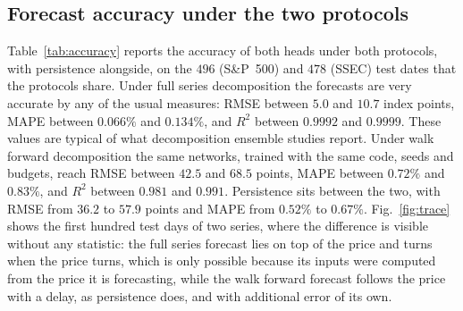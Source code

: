 \documentclass[pdflatex,sn-mathphys-num]{sn-jnl}%
\theoremstyle{thmstyleone}%
\theoremstyle{thmstyletwo}%
\theoremstyle{thmstylethree}%
\begin{document}
\subsection{Forecast accuracy under the two protocols}
Table~\ref{tab:accuracy} reports the accuracy of both heads under both
protocols, with persistence alongside, on the $496$ (S\&P~500) and $478$
(SSEC) test dates that the protocols share. Under full series decomposition
the forecasts are very accurate by any of the usual measures: RMSE between
$5.0$ and $10.7$ index points, MAPE between $0.066\%$ and $0.134\%$, and $R^2$
between $0.9992$ and $0.9999$. These values are typical of what decomposition
ensemble studies report. Under walk forward decomposition the same networks,
trained with the same code, seeds and budgets, reach RMSE between $42.5$ and
$68.5$ points, MAPE between $0.72\%$ and $0.83\%$, and $R^2$ between $0.981$
and $0.991$. Persistence sits between the two, with RMSE from $36.2$ to $57.9$
points and MAPE from $0.52\%$ to $0.67\%$. Fig.~\ref{fig:trace} shows the
first hundred test days of two series, where the difference is visible without
any statistic: the full series forecast lies on top of the price and turns
when the price turns, which is only possible because its inputs were computed
from the price it is forecasting, while the walk forward forecast follows the
price with a delay, as persistence does, and with additional error of its own.
\end{document}
